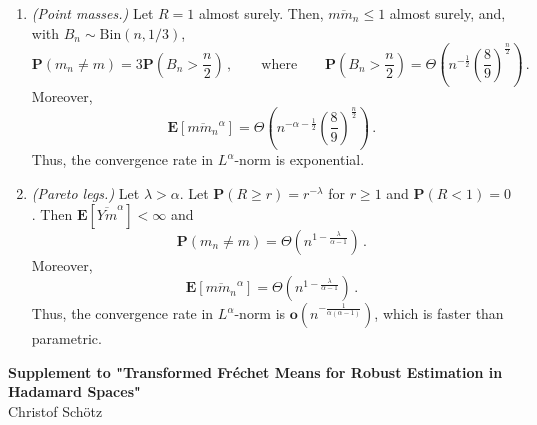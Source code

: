 \documentclass{article}
\newcommand*{\mo}[1]{\mathbf{#1}}
\newcommand{\lab}{\left[} %
\newcommand{\rab}{\right]} %
\newcommand{\ab}[1]{\lab #1 \rab} %
\newcommand{\abOf}[1]{\!\ab{#1}} %
\newcommand{\lb}{\left(} %
\newcommand{\rb}{\right)} %
\newcommand{\br}[1]{\lb #1 \rb} %
\newcommand{\brOf}[1]{\!\br{#1}} %
\renewcommand{\Pr}{\mathbf{P}} %
\newcommand{\Prof}[1]{\Pr(#1)}
\newcommand{\PrOf}[1]{\Pr\brOf{#1}}
\newcommand{\E}{\mathbf{E}} %
\newcommand{\Eof}[1]{\E[#1]}
\newcommand{\EOf}[1]{\E\abOf{#1}}
\newcommand{\eqcm}{\,,} %
\newcommand{\eqfs}{\,.}
\newcommand{\ol}[2]{\overline{#1#2}}
\begin{document}
\begin{example}
    \begin{enumerate}[label=(\roman*)]
        \item\emph{(Point masses.)} 
        Let $R = 1$ almost surely. Then, $\ol{m}{m_n} \leq 1$ almost surely, and, with $B_n\sim\mathrm{Bin}(n,1/3)$,
        \begin{equation}
            \PrOf{m_n\neq m} = 3 \PrOf{B_n > \frac n2}\eqcm
            \qquad\text{where}\qquad
            \PrOf{B_n > \frac n2} = \Theta\brOf{n^{-\frac12}\br{\frac89}^{\frac n2}}
            \eqfs
        \end{equation}
        Moreover,
        \begin{equation}
            \EOf{\ol{m}{m_n}^{\alpha}}
            =
            \Theta\brOf{n^{-\alpha-\frac12}\br{\frac89}^{\frac n2}}
            \eqfs
        \end{equation}        
        Thus, the convergence rate in $L^\alpha$-norm is exponential.
        \item\emph{(Pareto legs.)}
        Let $\lambda > \alpha$.
        Let $\Prof{R\geq r}=r^{-\lambda}$ for $r\geq1$ and $\Prof{R < 1} = 0$.
        Then $\Eof{\ol Ym^\alpha} < \infty$ and
        \begin{equation}
            \Prof{m_n\neq m} = \Theta\brOf{n^{1-\frac{\lambda}{\alpha-1}}}
            \eqfs
        \end{equation}
        Moreover,
        \begin{equation}
            \Eof{\ol{m}{m_n}^{\alpha}} = \Theta\brOf{n^{1-\frac{\lambda}{\alpha-1}}}
            \eqfs
        \end{equation}
        Thus, the convergence rate in $L^\alpha$-norm is $\mo o(n^{-\frac{1}{\alpha(\alpha-1)}})$, which is faster than parametric.
    \end{enumerate}
\end{example}

%
\printbibliography
%

\clearpage

\setcounter{page}{1}

\vspace*{2cm}
\begin{center}
	{\LARGE \textbf{Supplement to "Transformed Fr\'echet Means for Robust Estimation in Hadamard Spaces"}}\\[1em]  %
	{\large Christof Sch\"otz}  %
\end{center}
\vspace{2em}
\end{document}
